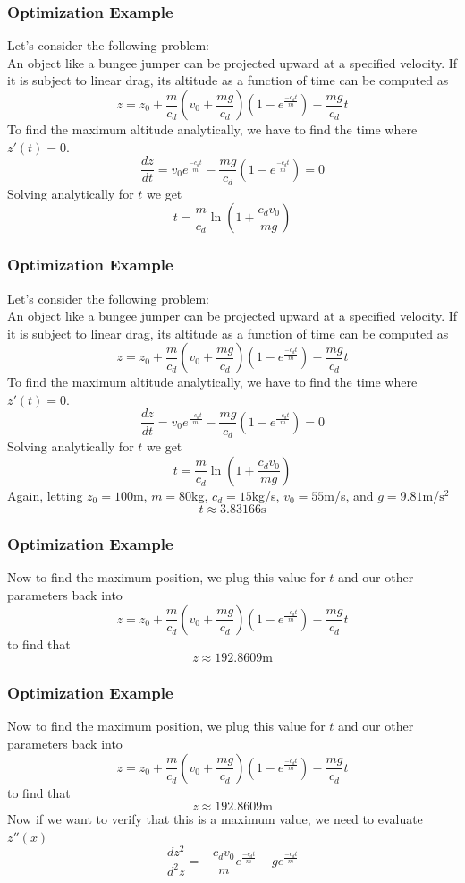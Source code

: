 \documentclass{if-beamer}
\begin{document}
\begin{frame}
	\frametitle{Optimization Example}
	Let's consider the following problem: \\\vspace{8pt}
	An object like a bungee jumper can be projected upward at a specified velocity. If it is subject to linear drag, its altitude as a function of time can be computed as
	$$ z = z_0 +\frac{m}{c_d}\left(v_0+\frac{mg}{c_d}\right)\left(1-e^{\frac{-c_dt}{m}}\right) -\frac{mg}{c_d}t $$
	To find the maximum altitude analytically, we have to find the time where $z'(t) = 0$.
	$$\frac{dz}{dt} = v_0e^{\frac{-c_dt}{m}} - \frac{mg}{c_d}\left(1-e^{\frac{-c_dt}{m}}\right)=0$$
	Solving analytically for $t$ we get
	$$ t = \frac{m}{c_d}\ln\left(1+\frac{c_dv_0}{mg} \right) $$
\end{frame}

\begin{frame}
	\frametitle{Optimization Example}
	Let's consider the following problem: \\\vspace{8pt}
	An object like a bungee jumper can be projected upward at a specified velocity. If it is subject to linear drag, its altitude as a function of time can be computed as
	$$ z = z_0 +\frac{m}{c_d}\left(v_0+\frac{mg}{c_d}\right)\left(1-e^{\frac{-c_dt}{m}}\right) -\frac{mg}{c_d}t $$
	To find the maximum altitude analytically, we have to find the time where $z'(t) = 0$.
	$$\frac{dz}{dt} = v_0e^{\frac{-c_dt}{m}} - \frac{mg}{c_d}\left(1-e^{\frac{-c_dt}{m}}\right)=0$$
	Solving analytically for $t$ we get
	$$ t = \frac{m}{c_d}\ln\left(1+\frac{c_dv_0}{mg} \right) $$
	Again, letting $z_0 = 100$m, $m = 80$kg, $c_d = 15$kg/s, $v_0 = 55$m/s, and $g = 9.81$m/$\textrm{s}^2$
	$$ t \approx 3.83166\textrm{s}$$
\end{frame}

\begin{frame}
	\frametitle{Optimization Example}
	Now to find the maximum position, we plug this value for $t$ and our other parameters back into 
		$$ z = z_0 +\frac{m}{c_d}\left(v_0+\frac{mg}{c_d}\right)\left(1-e^{\frac{-c_dt}{m}}\right) -\frac{mg}{c_d}t $$
	to find that 
	$$ z \approx 192.8609 \textrm{m}$$
\end{frame}

\begin{frame}
	\frametitle{Optimization Example}
	Now to find the maximum position, we plug this value for $t$ and our other parameters back into 
	$$ z = z_0 +\frac{m}{c_d}\left(v_0+\frac{mg}{c_d}\right)\left(1-e^{\frac{-c_dt}{m}}\right) -\frac{mg}{c_d}t $$
	to find that 
	$$ z \approx 192.8609 \textrm{m}$$
	Now if we want to verify that this is a maximum value, we need to evaluate $z''(x)$
	$$\frac{dz^2}{d^2z} = -\frac{c_dv_0}{m}e^{\frac{-c_dt}{m}} -ge^{\frac{-c_dt}{m}}$$
\end{frame}
\end{document}
